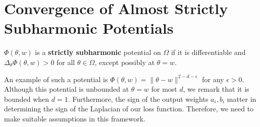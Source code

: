 \section{Convergence of Almost Strictly Subharmonic Potentials}\label{App:Subharm}


%
%
\begin{definition}
$\Phi(\theta,w)$ is a {\bf strictly subharmonic} potential on $\Omega$ if it is differentiable and $\Delta_\theta \Phi(\theta,w) > 0$ for all $\theta \in \Omega$, except possibly at $\theta = w$.
\end{definition}

An example of such a potential is $\Phi(\theta, w) = \|\theta -w \|^{2-d-\epsilon}$ for any $\epsilon > 0$. Although this potential is unbounded at $\theta = w$ for most $d$, we remark that it is bounded when $d = 1$. Furthermore, the sign of the output weights $a_i, b_i$ matter in determining the sign of the Laplacian of our loss function. Therefore, we need to make suitable assumptions in this framework.

%

